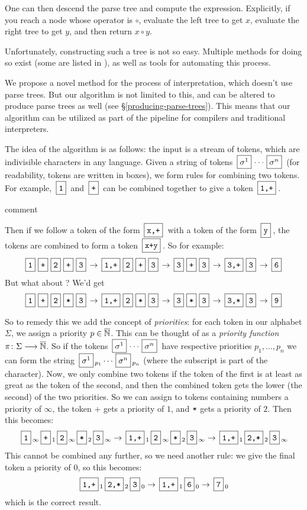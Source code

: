 \documentclass{llncs}
\newcounter{algo}
\newcommand{\yoni}[1]{{\begin{mdframed}[linecolor=red]{\color{red}#1}\end{mdframed}}}
\begin{document}
One can then descend the parse tree and compute the expression.
Explicitly, if you reach a node whose operator is $\circ$, evaluate the left tree to get $x$, evaluate the right tree to get $y$, and then return $x\circ y$.

Unfortunately, constructing such a tree is not so easy.
Multiple methods for doing so exist (some are listed in \cite{dragon}), as well as tools for automating this process.

We propose a novel method for the process of interpretation, which doesn't use parse trees.
But our algorithm is not limited to this, and can be altered to produce parse trees as well (see \S\ref{producing-parse-trees}).
This means that our algorithm can be utilized as part of the pipeline for compilers and traditional interpreters.

The idea of the algorithm is as follows: the input is a stream of tokens, which are indivisible characters in any language.
Given a string of tokens $\mb{\sigma^1}\cdots\mb{\sigma^n}$ (for readability, tokens are written in boxes), we form rules for combining two tokens.
For example, $\mb{\ttt1}$ and $\mb{\ttt+}$ can be combined together to give a token $\mb{\ttt{1,+}}$.
\yoni{comment}
Then if we follow a token of the form $\mb{\ttt{x,+}}$ with a token of the form $\mb{\ttt y}$, the tokens are combined to form a token $\mb{\ttt{x+y}}$.
So for example:
\[ \mbt{1} \mbt{+} \mbt{2} \mbt{+} \mbt{3} \to \mbt{1,+} \mbt2 \mbt+ \mbt3 \to \mbt{3} \mbt+ \mbt3 \to \mbt{3,+} \mbt3 \to \mbt6 \]
But what about ?
We'd get
\[ \mbt1 \mbt+ \mbt2 \mbt* \mbt3 \to \mbt{1,+} \mbt2 \mbt* \mbt3 \to \mbt3 \mbt* \mbt3 \to \mbt{3,*} \mbt3 \to \mbt9 \]

So to remedy this we add the concept of \textit{priorities}: for each token in our alphabet $\Sigma$, we assign a priority $p\in\overline{\mathbb N}$.
This can be thought of as a \textit{priority function} $\pi\colon\Sigma\longrightarrow\overline{\mathbb N}$.
So if the tokens $\mb{\sigma^1}\cdots\mb{\sigma^n}$ have respective priorities $p_1,\dots,p_n$ we can form the string $\mb{\sigma^1}_{p_1}\cdots\mb{\sigma^n}_{p_n}$ (where the subscript is part of the
character).
Now, we only combine two tokens if the token of the first is at least as great as the token of the second, and then the combined token gets the lower (the second) of the two priorities.
So we can assign to tokens containing numbers a priority of $\infty$, the token \ttt+ gets a priority of $1$, and $\texttt*$ gets a priority of $2$.
Then this becomes:
\[ \mbt1_\infty \mbt+_1 \mbt2_\infty \mbt*_2 \mbt3_\infty \to \mbt{1,+}_1 \mbt2_\infty \mbt*_2 \mbt3_\infty \to \mbt{1,+}_1 \mbt{2,*}_2 \mbt3_\infty \]
This cannot be combined any further, so we need another rule: we give the final token a priority of $0$, so this becomes:
\[ \mbt{1,+}_1 \mbt{2,*}_2 \mbt3_0 \to \mbt{1,+}_1 \mbt{6}_0 \to \mbt{7}_0 \]
which is the correct result.
\end{document}
